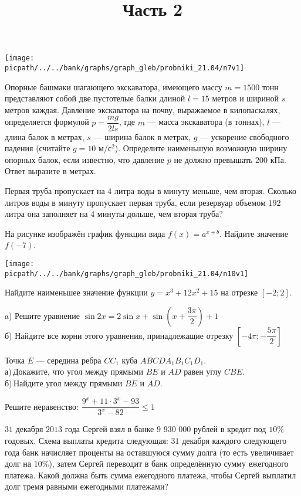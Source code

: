 \begin{training}[1]
\begin{listofex}[resume]
		\begin{center}
			\texttt{[image: \\picpath/../../bank/graphs/graph\_gleb/probniki\_21.04/n7v1]}
		\end{center}
		\foranswer
		\item Опорные башмаки шагающего экскаватора, имеющего массу \( m=1500 \) тонн представляют собой две пустотелые балки длиной \( l=15 \) метров и шириной \( s \) метров каждая. Давление экскаватора на почву, выражаемое в килопаскалях, определяется формулой \( p=\dfrac{mg}{2ls} \), где \( m \) --- масса экскаватора (в тоннах), \( l \) ---длина балок в метрах, \( s \) --- ширина балок в метрах, \( g \) --- ускорение свободного падения (считайте \( g=10 \) м/с\( ^2 \)). Определите наименьшую возможную ширину опорных балок, если известно, что давление \( p \) не должно превышать \( 200 \) кПа. Ответ выразите в метрах.
		\foranswer
		\item Первая труба пропускает на \( 4 \) литра воды в минуту меньше, чем вторая. Сколько литров воды в минуту пропускает первая труба, если резервуар объемом \( 192 \) литра она заполняет на 4 минуты дольше, чем вторая труба?
		\foranswer
		\hphantom{Часть 1}
		\item 
		На рисунке изображён график функции вида \( f(x)=a^{x+b} \). Найдите значение \( f(-7) \).
		\begin{center}
			\texttt{[image: \\picpath/../../bank/graphs/graph\_gleb/probniki\_21.04/n10v1]}
		\end{center}
		\foranswer
		\item Найдите наименьшее значение функции \( y=x^3+12x^2+15 \) на отрезке \( [-2;2] \).
		\foranswer
		\egepreambtwo
		\title{Часть 2}
		\item a) Решите уравнение \( \sin2x=2\sin x + \sin \left( x+\dfrac{ 3\pi }{ 2 } \right)+1\) \\
		б) Найдите все корни этого уравнения, принадлежащие отрезку \( \left[ - 4\pi; -\dfrac{5\pi}{2} \right]  \)
		\hphantom{Часть 1}
		\item Точка \( E \) --- середина ребра \( CC_1 \) куба \( ABCDA_1B_1C_1D_1 \). \\
		а) Докажите, что угол между прямыми \( BE \) и \( AD \) равен углу \( CBE \).\\		
		б) Найдите угол между прямыми \( BE \) и \( AD \).
		\item Решите неравенство: \( \dfrac{9^x+11\cdot3^x-93}{3^x-82}\le1 \)
		\item \( 31 \) декабря \( 2013 \) года Сергей взял в банке \( 9 \) \(930\) \(000\) рублей в кредит под \( 10\% \) годовых. Схема выплаты кредита следующая: \( 31 \) декабря каждого следующего года банк начисляет проценты на оставшуюся сумму долга (то есть увеличивает долг на \( 10\% \)), затем Сергей переводит в банк определённую сумму ежегодного платежа. Какой должна быть сумма ежегодного платежа, чтобы Сергей выплатил долг тремя равными ежегодными платежами?

\end{listofex}
\end{training}
